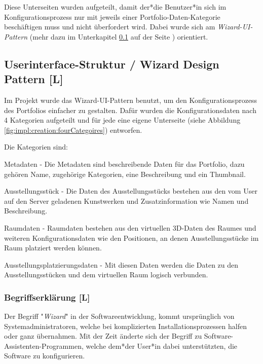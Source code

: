 Diese Unterseiten wurden aufgeteilt, damit der*die Benutzer*in sich im Konfigurationsprozess nur mit jeweils einer Portfolio-Daten-Kategorie beschäftigen muss und nicht überfordert wird. Dabei wurde sich  am \emph{Wizard-UI-Pattern} (mehr dazu im Unterkapitel \ref{sec::contentcreation::wizard} auf der Seite \pageref{sec::contentcreation::wizard}) orientiert.

\subsection{Userinterface-Struktur / Wizard Design Pattern [L]}
\label{sec::contentcreation::wizard}
Im Projekt wurde das Wizard-UI-Pattern benutzt, um den Konfigurationsprozess des Portfolios einfacher zu gestalten. Dafür wurden die Konfigurationsdaten nach 4 Kategorien aufgeteilt und für jede eine eigene Unterseite (siehe Abbildung \ref{fig:impl:creation:fourCategoires}) entworfen.

Die Kategorien sind:
\begin{compactitem}
\item Metadaten - Die Metadaten sind beschreibende Daten für das Portfolio, dazu gehören Name, zugehörige Kategorien, eine Beschreibung und ein Thumbnail.
\item Ausstellungsstück - Die Daten des Ausstellungsstücks bestehen aus den vom User auf den Server geladenen Kunstwerken und Zusatzinformation wie Namen und Beschreibung.
\item Raumdaten - Raumdaten bestehen aus den virtuellen 3D-Daten des Raumes und weiteren Konfigurationsdaten wie den Positionen, an denen Ausstellungsstücke im Raum platziert werden können.
\item Ausstellungsplatzierungsdaten - Mit diesen Daten werden die Daten zu den Ausstellungsstücken und dem virtuellen Raum logisch verbunden.
\end{compactitem}

\subsubsection*{Begriffserklärung [L]}
Der Begriff "\emph{Wizard}" in der Softwareentwicklung, kommt ursprünglich von Systemadministratoren, welche bei komplizierten Installationsprozessen halfen oder ganz übernahmen. Mit der Zeit änderte sich der Begriff zu Software-Assistenten-Programmen, welche dem*der User*in dabei unterstützten, die Software zu konfigurieren. \cite[Ursprung des Begriffs Wizard]{OrigionOfWizards}

